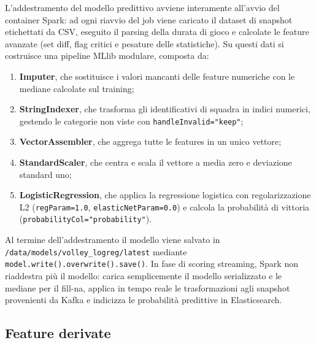 \documentclass[a4paper,12pt]{report}
\begin{document}
L’addestramento del modello predittivo avviene interamente all’avvio del container Spark: ad ogni riavvio del job viene caricato il dataset di snapshot etichettati da CSV, eseguito il parsing della durata di gioco e calcolate le feature avanzate (set diff, flag critici e pesature delle statistiche). Su questi dati si costruisce una pipeline MLlib modulare, composta da:
\begin{enumerate}
  \item \textbf{Imputer}, che sostituisce i valori mancanti delle feature numeriche con le mediane calcolate sul training;
  \item \textbf{StringIndexer}, che trasforma gli identificativi di squadra in indici numerici, gestendo le categorie non viste con \texttt{handleInvalid="keep"};
  \item \textbf{VectorAssembler}, che aggrega tutte le features in un unico vettore;
  \item \textbf{StandardScaler}, che centra e scala il vettore a media zero e deviazione standard uno;
  \item \textbf{LogisticRegression}, che applica la regressione logistica con regolarizzazione L2 (\texttt{regParam=1.0}, \texttt{elasticNetParam=0.0}) e calcola la probabilità di vittoria (\texttt{probabilityCol="probability"}).
\end{enumerate}
Al termine dell’addestramento il modello viene salvato in \texttt{/data/models/volley\_logreg/latest} mediante \texttt{model.write().overwrite().save()}. In fase di scoring streaming, Spark non riaddestra più il modello: carica semplicemente il modello serializzato e le mediane per il fill-na, applica in tempo reale le trasformazioni agli snapshot provenienti da Kafka e indicizza le probabilità predittive in Elasticsearch.


\subsection{Feature derivate}
\end{document}
